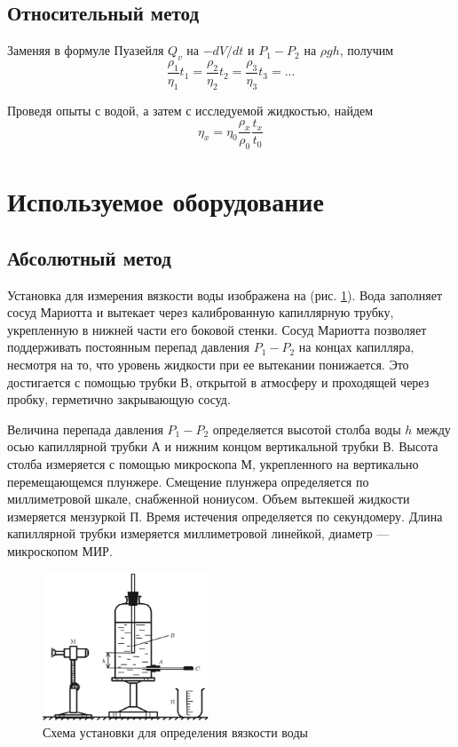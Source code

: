 \documentclass[a4paper,12pt]{article} %
\begin{document}
\subsection*{Относительный метод}

Заменяя в формуле Пуазейля $Q_v$ на $-dV/dt$ и $P_1 - P_2$ на $\rho g h$, получим
\begin{equation}
	\frac{\rho_1}{\eta_1}t_1 = \frac{\rho_2}{\eta_2}t_2 = \frac{\rho_3}{\eta_3}t_3 = ...
\end{equation}

Проведя опыты с водой, а затем с исследуемой жидкостью, найдем
\begin{equation}
	\eta_x = \eta_0\frac{\rho_x}{\rho_0}\frac{t_x}{t_0}
\end{equation}

\section{Используемое оборудование}

\subsection*{Абсолютный метод}

Установка для измерения вязкости воды изображена на (рис. \ref{setup1}).
Вода заполняет сосуд Мариотта и вытекает через калиброванную капиллярную трубку, укрепленную в нижней части его боковой стенки. Сосуд Мариотта позволяет поддерживать постоянным перепад давления $P_1 - P_2$ на концах капилляра, несмотря на то, что уровень жидкости при ее вытекании понижается. Это достигается с помощью трубки В, открытой в атмосферу и проходящей через пробку, герметично закрывающую сосуд. \par
Величина перепада давления $P_1 - P_2$ определяется высотой столба воды $h$ между осью капиллярной трубки А и нижним концом вертикальной трубки В. Высота столба измеряется с помощью микроскопа М, укрепленного на вертикально перемещающемся плунжере. Смещение плунжера определяется по миллиметровой шкале, снабженной нониусом. Объем вытекшей жидкости измеряется мензуркой П. Время истечения определяется по секундомеру. Длина капиллярной трубки измеряется миллиметровой линейкой, диаметр ---
микроскопом МИР.

\begin{figure}[h!]
    \centering
    \includegraphics[width=0.44\textwidth]{установка1}
    \caption{Схема установки для определения вязкости воды}
	\label{setup1}
\end{figure}
\end{document}
